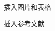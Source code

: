 \documentclass[10pt,aspectratio=43,mathserif]{beamer}
\begin{document}

\begin{frame}{插入图片和表格}
\end{frame}

\begin{frame}[fragile]{插入参考文献}
\end{frame}
\end{document}
